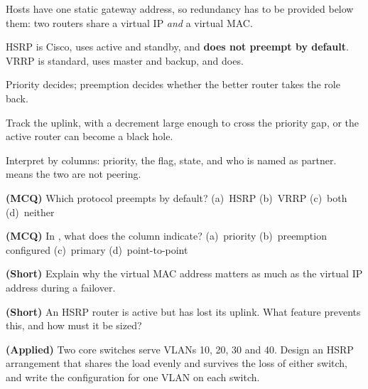 \begin{chaptersummary}
\begin{tight}
  \item Hosts have one static gateway address, so redundancy has to be provided
        below them: two routers share a virtual IP \emph{and} a virtual MAC.
  \item HSRP is Cisco, uses active and standby, and \textbf{does not preempt by
        default}. VRRP is standard, uses master and backup, and does.
  \item Priority decides; preemption decides whether the better router takes the
        role back.
  \item Track the uplink, with a decrement large enough to cross the priority
        gap, or the active router can become a black hole.
  \item Interpret  by columns: priority, the 
        flag, state, and who is named as partner.  means the
        two are not peering.
\end{tight}
\end{chaptersummary}

\begin{reviewq}
  \item \textbf{(MCQ)} Which protocol preempts by default?
        (a)~HSRP (b)~VRRP (c)~both (d)~neither
  \item \textbf{(MCQ)} In , what does the  column
        indicate? (a)~priority (b)~preemption configured (c)~primary
        (d)~point-to-point
  \item \textbf{(Short)} Explain why the virtual MAC address matters as much as
        the virtual IP address during a failover.
  \item \textbf{(Short)} An HSRP router is active but has lost its uplink. What
        feature prevents this, and how must it be sized?
  \item \textbf{(Applied)} Two core switches serve VLANs 10, 20, 30 and 40. Design
        an HSRP arrangement that shares the load evenly and survives the loss of
        either switch, and write the configuration for one VLAN on each switch.
\end{reviewq}
